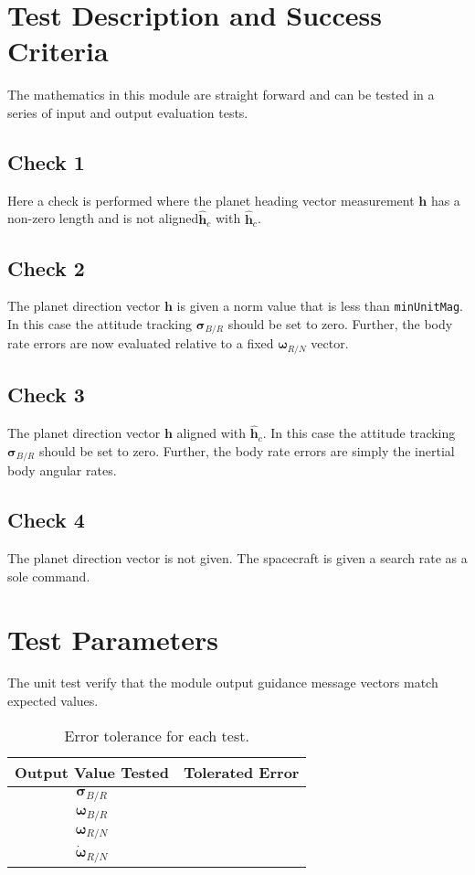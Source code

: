 
\section{Test Description and Success Criteria}
The mathematics in this module are straight forward and can be tested in a series of input and output evaluation tests.


\subsection{Check 1}
Here a check is performed where the planet heading vector measurement $\bm h$ has a non-zero length and is not aligned$\hat{\bm h}_{c}$ with $\hat{\bm h}_{c}$.  

\subsection{Check 2}
The planet direction vector $\bm h$ is given a norm value that is less than {\tt minUnitMag}.  In this case the attitude tracking $\bm\sigma_{B/R}$ should be set to zero.  Further, the body rate errors are now evaluated relative to a fixed $\bm\omega_{R/N}$ vector.  

\subsection{Check 3}
The planet direction vector $\bm h$ aligned with $\hat{\bm h}_{c}$.  In this case the attitude tracking $\bm\sigma_{B/R}$ should be set to zero.  Further, the body rate errors are simply the inertial body angular rates.  

\subsection{Check 4}
The planet direction vector is not given. The spacecraft is given a search rate as a sole command.



\section{Test Parameters}
The unit test verify that the module output guidance message vectors match expected values.
\begin{table}[htbp]
	\caption{Error tolerance for each test.}
	\label{tab:errortol}
	\centering \fontsize{10}{10}\selectfont
	\begin{tabular}{ c | c } %
		\hline\hline
		\textbf{Output Value Tested}  & \textbf{Tolerated Error}  \\ 
		\hline
		$\bm\sigma_{B/R}$        & 	   \\ 
		$\bm\omega_{B/R}$        & \\ 
		$\bm\omega_{R/N}$        &  \\ 
		$\dot{\bm\omega}_{R/N}$        &   \\ 
		\hline\hline
	\end{tabular}
\end{table}

